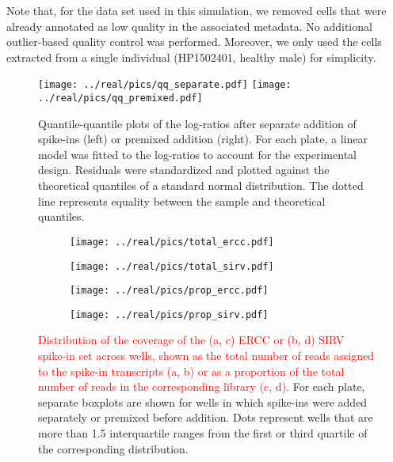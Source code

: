 \documentclass{article}
\newcommand\revised[1]{\textcolor{red}{#1}}
\begin{document}
Note that, for the data set used in this simulation, we removed cells that were already annotated as low quality in the associated metadata.
No additional outlier-based quality control was performed.
Moreover, we only used the cells extracted from a single individual (HP1502401, healthy male) for simplicity.




\newpage
\begin{figure}[btp]
    \begin{center}
        \texttt{[image: ../real/pics/qq\_separate.pdf]}
        \texttt{[image: ../real/pics/qq\_premixed.pdf]}
    \end{center}
    \caption{Quantile-quantile plots of the log-ratios after separate addition of spike-ins (left) or premixed addition (right).
        For each plate, a linear model was fitted to the log-ratios to account for the experimental design.
        Residuals were standardized and plotted against the theoretical quantiles of a standard normal distribution.
        The dotted line represents equality between the sample and theoretical quantiles.
    }
\end{figure}

\begin{figure}[btp]
    \begin{center}
        \begin{subfigure}{0.49\textwidth}
            \texttt{[image: ../real/pics/total\_ercc.pdf]}
            \caption{}
        \end{subfigure}
        \begin{subfigure}{0.49\textwidth}
            \texttt{[image: ../real/pics/total\_sirv.pdf]}
            \caption{}
        \end{subfigure}
        \begin{subfigure}{0.49\textwidth}
            \texttt{[image: ../real/pics/prop\_ercc.pdf]}
            \caption{}
        \end{subfigure}
        \begin{subfigure}{0.49\textwidth}
            \texttt{[image: ../real/pics/prop\_sirv.pdf]}
            \caption{}
        \end{subfigure}
    \end{center}
    \caption{\revised{Distribution of the coverage of the (a, c) ERCC or (b, d) SIRV spike-in set across wells, 
        shown as the total number of reads assigned to the spike-in transcripts (a, b) or as a proportion of the total number of reads in the corresponding library (c, d).}
        For each plate, separate boxplots are shown for wells in which spike-ins were added separately or premixed before addition.
        Dots represent wells that are more than 1.5 interquartile ranges from the first or third quartile of the corresponding distribution.
    }
    \label{fig:totals}
\end{figure}
\end{document}
